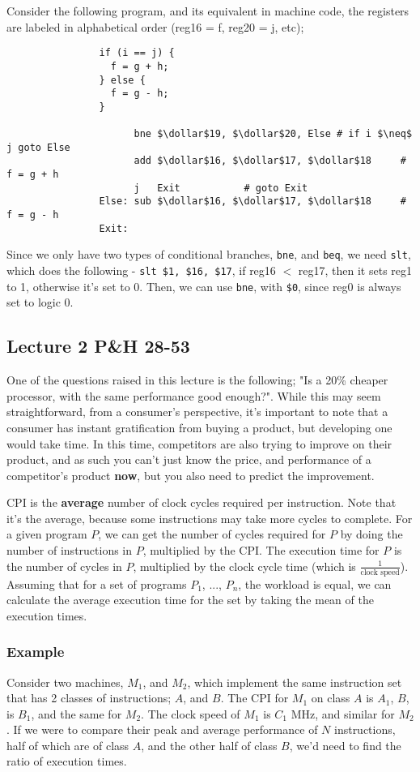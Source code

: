 \documentclass[a4paper, 12pt]{article}
\newcommand{\dollar}{\mbox{\textdollar}} %
\begin{document}
            Consider the following program, and its equivalent in machine code, the registers are labeled in alphabetical order (reg16 = f, reg20 = j, etc);
            \begin{lstlisting}
                if (i == j) {
                  f = g + h;
                } else {
                  f = g - h;
                }

                      bne $\dollar$19, $\dollar$20, Else # if i $\neq$ j goto Else
                      add $\dollar$16, $\dollar$17, $\dollar$18     # f = g + h
                      j   Exit           # goto Exit
                Else: sub $\dollar$16, $\dollar$17, $\dollar$18     # f = g - h
                Exit:
            \end{lstlisting}
            Since we only have two types of conditional branches, \texttt{bne}, and \texttt{beq}, we need \texttt{slt}, which does the following - \texttt{slt \$1, \$16, \$17}, if reg16 $<$ reg17, then it sets reg1 to 1, otherwise it's set to 0. Then, we can use \texttt{bne}, with \texttt{\$0}, since reg0 is always set to logic 0.
        \subsection*{Lecture 2 \hfill P\&H 28-53}
            One of the questions raised in this lecture is the following; "Is a 20\% cheaper processor, with the same performance good enough?". While this may seem straightforward, from a consumer's perspective, it's important to note that a consumer has instant gratification from buying a product, but developing one would take time. In this time, competitors are also trying to improve on their product, and as such you can't just know the price, and performance of a competitor's product \textbf{now}, but you also need to predict the improvement.
            \medskip

            CPI is the \textbf{average} number of clock cycles required per instruction. Note that it's the average, because some instructions may take more cycles to complete. For a given program $P$, we can get the number of cycles required for $P$ by doing the number of instructions in $P$, multiplied by the CPI. The execution time for $P$ is the number of cycles in $P$, multiplied by the clock cycle time (which is $\frac{1}{\text{clock speed}}$). Assuming that for a set of programs $P_1$, ..., $P_n$, the workload is equal, we can calculate the average execution time for the set by taking the mean of the execution times.
            \subsubsection*{Example}
                Consider two machines, $M_1$, and $M_2$, which implement the same instruction set that has 2 classes of instructions; $A$, and $B$. The CPI for $M_1$ on class $A$ is $A_1$, $B$, is $B_1$, and the same for $M_2$. The clock speed of $M_1$ is $C_1$ MHz, and similar for $M_2$. If we were to compare their peak and average performance of $N$ instructions, half of which are of class $A$, and the other half of class $B$, we'd need to find the ratio of execution times.
                \medskip
\end{document}
